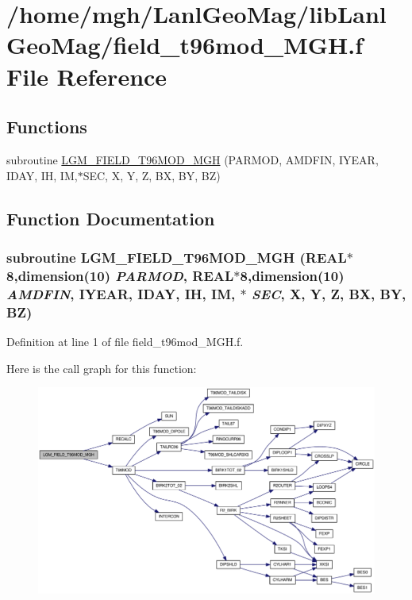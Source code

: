 \hypertarget{field__t96mod___m_g_h_8f}{
\section{/home/mgh/LanlGeoMag/libLanlGeoMag/field\_\-t96mod\_\-MGH.f File Reference}
\label{field__t96mod___m_g_h_8f}
}
\subsection*{Functions}
\begin{CompactItemize}
\item 
subroutine \hyperlink{field__t96mod___m_g_h_8f_5a732b256b81c865c31b7f742ed6f797}{LGM\_\-FIELD\_\-T96MOD\_\-MGH} (PARMOD, AMDFIN, IYEAR, IDAY, IH, IM,$\ast$SEC, X, Y, Z, BX, BY, BZ)
\end{CompactItemize}


\subsection{Function Documentation}
\hypertarget{field__t96mod___m_g_h_8f_5a732b256b81c865c31b7f742ed6f797}{
\subsubsection[{LGM\_\-FIELD\_\-T96MOD\_\-MGH}]{\setlength{\rightskip}{0pt plus 5cm}subroutine LGM\_\-FIELD\_\-T96MOD\_\-MGH (REAL$\ast$8,dimension(10) {\em PARMOD}, \/  REAL$\ast$8,dimension(10) {\em AMDFIN}, \/  IYEAR, \/  IDAY, \/  IH, \/  IM, \/  $\ast$ {\em SEC}, \/  X, \/  Y, \/  Z, \/  BX, \/  BY, \/  BZ)}}
\label{field__t96mod___m_g_h_8f_5a732b256b81c865c31b7f742ed6f797}




Definition at line 1 of file field\_\-t96mod\_\-MGH.f.

Here is the call graph for this function:\nopagebreak
\begin{figure}[H]
\begin{center}
\leavevmode
\includegraphics[width=420pt]{field__t96mod___m_g_h_8f_5a732b256b81c865c31b7f742ed6f797_cgraph}
\end{center}
\end{figure}
